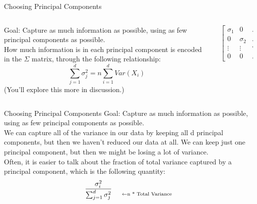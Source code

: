 \documentclass[aspectratio=169]{../latex_main/tntbeamer}  %
\begin{document}
	
	\begin{frame}{Choosing Principal Components}
	    \begin{columns}
	        \begin{column}{.5\textwidth}
	                Goal: Capture as much information as possible, using as few principal components as possible.\\
	                How much information is in each principal component is encoded in the $\Sigma$ matrix, through the following relationship:
	                \begin{equation*}
	                    \sum\limits_{j=1}^d\sigma^2_j = n\sum\limits_{i=1}^dVar(X_i)
	                \end{equation*}
	                (You’ll explore this more in discussion.)
	        \end{column}
	        
	        
	        \begin{column}{.5\textwidth}
	            \begin{equation*}
	                \left[\begin{array}{cccc}
	                        \sigma_1 & 0 & \dots & 0 \\
	                         0 & \sigma_2 & \dots & 0 \\
	                        \vdots &     \vdots   &   \ddots  &  \vdots  \\
	                        0 & 0 & \dots &\sigma_d
	                    \end{array}\right]
	            \end{equation*}
	        \end{column}
	    \end{columns}
	\end{frame}
	
	
	\begin{frame}{Choosing Principal Components}
	    Goal: Capture as much information as possible, using as few principal components as possible.\\
	    We can capture all of the variance in our data by keeping all d principal components, but then we haven’t reduced our data at all. We can keep just one principal component, but then we might be losing a lot of variance.\\
	    Often, it is easier to talk about the fraction of total variance captured by a principal component, which is the following quantity:
	    \begin{equation*}
	        \frac{\sigma^2_i}{\sum_{j=1}^d\sigma^2_j} \hspace{.5cm}\underset{\leftarrow \text{n * Total Variance}}{} 
	    \end{equation*}
	\end{frame}
	
\end{document}
